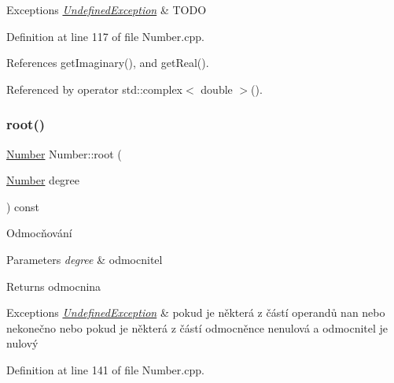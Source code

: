 \begin{DoxyExceptions}{Exceptions}
{\em \hyperlink{classteam22_1_1_math_1_1_undefined_exception}{Undefined\+Exception}} & T\+O\+DO \\
\hline
\end{DoxyExceptions}


Definition at line 117 of file Number.\+cpp.



References get\+Imaginary(), and get\+Real().



Referenced by operator std\+::complex$<$ double $>$().

\mbox{\label{classteam22_1_1_math_1_1_number_ae2bbbafad08a50625b8070db1fc3ba98}} 
\subsubsection{\texorpdfstring{root()}{root()}}
{\footnotesize\ttfamily \hyperlink{classteam22_1_1_math_1_1_number}{Number} Number\+::root (\begin{DoxyParamCaption}\item[{\hyperlink{classteam22_1_1_math_1_1_number}{Number}}]{degree }\end{DoxyParamCaption}) const}



Odmocňování 


\begin{DoxyParams}{Parameters}
{\em degree} & odmocnitel \\
\hline
\end{DoxyParams}
\begin{DoxyReturn}{Returns}
odmocnina 
\end{DoxyReturn}

\begin{DoxyExceptions}{Exceptions}
{\em \hyperlink{classteam22_1_1_math_1_1_undefined_exception}{Undefined\+Exception}} & pokud je některá z částí operandů nan nebo nekonečno nebo pokud je některá z částí odmocněnce nenulová a odmocnitel je nulový \\
\hline
\end{DoxyExceptions}


Definition at line 141 of file Number.\+cpp.




